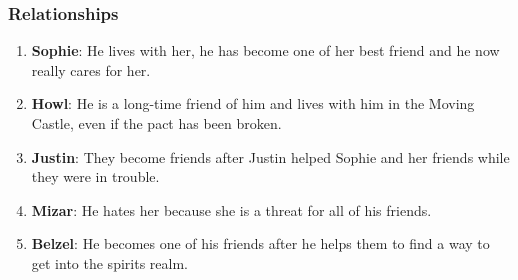 




\subsubsection*{Relationships}
\begin{enumerate}
\item \textbf{Sophie}: He lives with her, he has become one of her best friend and he now really cares for her.
\item \textbf{Howl}: He is a long-time friend of him and lives with him in the Moving Castle, even if the pact has been broken.
\item \textbf{Justin}: They become friends after Justin helped Sophie and her friends while they were in trouble.
\item \textbf{Mizar}: He hates her because she is a threat for all of his friends.
\item \textbf{Belzel}: He becomes one of his friends after he helps them to find a way to get into the spirits realm.
\end{enumerate}

